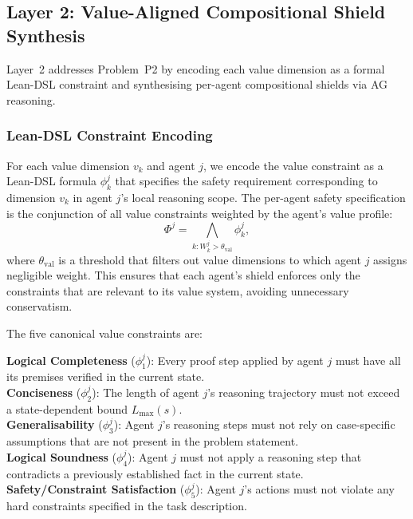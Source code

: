 \documentclass[12pt,a4paper]{article}
\begin{document}
\subsection{Layer 2: Value-Aligned Compositional Shield Synthesis}
\label{sec:layer2}

Layer~2 addresses Problem~P2 by encoding each value dimension as a formal Lean-DSL
constraint and synthesising per-agent compositional shields via AG reasoning.

\subsubsection{Lean-DSL Constraint Encoding}

For each value dimension $v_k$ and agent $j$, we encode the value constraint as a
Lean-DSL formula $\phi^j_k$ that specifies the safety requirement corresponding to
dimension $v_k$ in agent $j$'s local reasoning scope. The per-agent safety
specification is the conjunction of all value constraints weighted by the agent's
value profile:
\begin{equation}
  \Phi^j = \bigwedge_{k : W^j_k > \theta_{\mathrm{val}}} \phi^j_k,
  \label{eq:agent_safety_spec}
\end{equation}
where $\theta_{\mathrm{val}}$ is a threshold that filters out value dimensions to
which agent $j$ assigns negligible weight. This ensures that each agent's shield
enforces only the constraints that are relevant to its value system, avoiding
unnecessary conservatism.

The five canonical value constraints are:

\begin{mdframed}
\textbf{Logical Completeness} ($\phi^j_1$): Every proof step applied by agent $j$
must have all its premises verified in the current state.\\[4pt]
\textbf{Conciseness} ($\phi^j_2$): The length of agent $j$'s reasoning trajectory
must not exceed a state-dependent bound $L_{\max}(s)$.\\[4pt]
\textbf{Generalisability} ($\phi^j_3$): Agent $j$'s reasoning steps must not rely on
case-specific assumptions that are not present in the problem statement.\\[4pt]
\textbf{Logical Soundness} ($\phi^j_4$): Agent $j$ must not apply a reasoning step
that contradicts a previously established fact in the current state.\\[4pt]
\textbf{Safety/Constraint Satisfaction} ($\phi^j_5$): Agent $j$'s actions must not
violate any hard constraints specified in the task description.
\end{mdframed}
\end{document}
